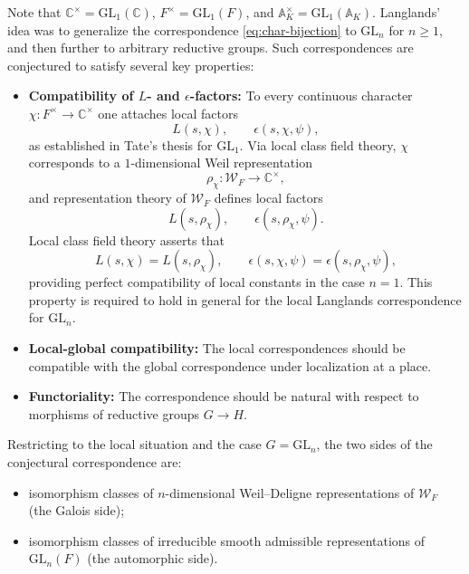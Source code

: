 \documentclass[11pt]{amsart}
\begin{document}
Note that \(\mathbb{C}^\times = \mathrm{GL}_1(\mathbb{C})\), 
\(F^\times = \mathrm{GL}_1(F)\), and 
\(\mathbb{A}_K^\times = \mathrm{GL}_1(\mathbb{A}_K)\).
Langlands’ idea was to generalize the correspondence 
\eqref{eq:char-bijection} to \(\mathrm{GL}_n\) for \(n \geq 1\), 
and then further to arbitrary reductive groups.
Such correspondences are conjectured to satisfy several key properties:
\begin{itemize}
    \item \textbf{Compatibility of $L$- and $\epsilon$-factors:}
    To every continuous character \(\chi: F^\times \to \mathbb{C}^\times\)
    one attaches local factors
    \[
    L(s,\chi), \qquad \epsilon(s,\chi,\psi),
    \]
    as established in Tate's thesis for \(\mathrm{GL}_1\).
    Via local class field theory, $\chi$ corresponds to a 
    $1$-dimensional Weil representation
    \[
    \rho_\chi : \mathcal{W}_F \longrightarrow \mathbb{C}^\times,
    \]
    and representation theory of $\mathcal{W}_F$ defines local factors
    \[
    L(s,\rho_\chi), \qquad \epsilon(s,\rho_\chi,\psi).
    \]
    Local class field theory asserts that
    \[
    L(s,\chi) = L(s,\rho_\chi), \qquad 
    \epsilon(s,\chi,\psi) = \epsilon(s,\rho_\chi,\psi),
    \]
    providing perfect compatibility of local constants in the case 
    \(n = 1\). This property is required to hold in general for the 
    local Langlands correspondence for $\mathrm{GL}_n$.
    
    \item \textbf{Local-global compatibility:} 
    The local correspondences should be compatible with the global 
    correspondence under localization at a place.
    
    \item \textbf{Functoriality:} 
    The correspondence should be natural with respect to morphisms 
    of reductive groups \(G \to H\).
\end{itemize}

Restricting to the local situation and the case \(G = \mathrm{GL}_n\),
the two sides of the conjectural correspondence are:
\begin{itemize}
    \item isomorphism classes of $n$-dimensional Weil--Deligne representations 
    of $\mathcal{W}_F$ (the Galois side);
    \item isomorphism classes of irreducible smooth admissible representations 
    of $\mathrm{GL}_n(F)$ (the automorphic side).
\end{itemize}
\end{document}
